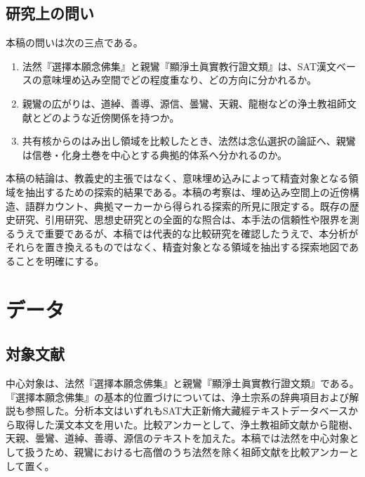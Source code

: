 \documentclass[uplatex,dvipdfmx,11pt,a4paper]{jsarticle}
\begin{document}
\subsection{研究上の問い}

本稿の問いは次の三点である。

\begin{enumerate}
  \item 法然『選擇本願念佛集』と親鸞『顯淨土眞實教行證文類』は、SAT漢文ベースの意味埋め込み空間でどの程度重なり、どの方向に分かれるか。
  \item 親鸞の広がりは、道綽、善導、源信、曇鸞、天親、龍樹などの浄土教祖師文献とどのような近傍関係を持つか。
  \item 共有核からのはみ出し領域を比較したとき、法然は念仏選択の論証へ、親鸞は信巻・化身土巻を中心とする典拠的体系へ分かれるのか。
\end{enumerate}

本稿の結論は、教義史的主張ではなく、意味埋め込みによって精査対象となる領域を抽出するための探索的結果である。本稿の考察は、埋め込み空間上の近傍構造、語群カウント、典拠マーカーから得られる探索的所見に限定する。既存の歴史研究、引用研究、思想史研究との全面的な照合は、本手法の信頼性や限界を測るうえで重要であるが、本稿では代表的な比較研究を確認したうえで、本分析がそれらを置き換えるものではなく、精査対象となる領域を抽出する探索地図であることを明確にする。

\section{データ}

\subsection{対象文献}

中心対象は、法然『選擇本願念佛集』と親鸞『顯淨土眞實教行證文類』である。『選擇本願念佛集』の基本的位置づけについては、浄土宗系の辞典項目および解説も参照した\cite{jodoshuzensho-senchaku,jodoshu-senchaku}。分析本文はいずれもSAT大正新脩大藏經テキストデータベースから取得した漢文本文を用いた。比較アンカーとして、浄土教祖師文献から龍樹、天親、曇鸞、道綽、善導、源信のテキストを加えた。本稿では法然を中心対象として扱うため、親鸞における七高僧のうち法然を除く祖師文献を比較アンカーとして置く。
\end{document}
